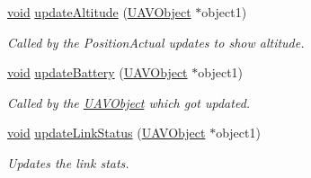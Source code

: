 \begin{DoxyCompactItemize}
\hyperlink{group___u_a_v_objects_plugin_ga444cf2ff3f0ecbe028adce838d373f5c}{void} \hyperlink{group___o_p_map_plugin_ga2502b994bd991dec300fec210a41d06c}{update\-Altitude} (\hyperlink{class_u_a_v_object}{U\-A\-V\-Object} $\ast$object1)
\begin{DoxyCompactList}\small\item\em Called by the Position\-Actual updates to show altitude. \end{DoxyCompactList}\item 
\hyperlink{group___u_a_v_objects_plugin_ga444cf2ff3f0ecbe028adce838d373f5c}{void} \hyperlink{group___o_p_map_plugin_ga098f60a9fd8da31477dcba4496d0f322}{update\-Battery} (\hyperlink{class_u_a_v_object}{U\-A\-V\-Object} $\ast$object1)
\begin{DoxyCompactList}\small\item\em Called by the \hyperlink{class_u_a_v_object}{U\-A\-V\-Object} which got updated. \end{DoxyCompactList}\item 
\hyperlink{group___u_a_v_objects_plugin_ga444cf2ff3f0ecbe028adce838d373f5c}{void} \hyperlink{group___o_p_map_plugin_ga2ac4d982767aaefdeb40a4b506c57497}{update\-Link\-Status} (\hyperlink{class_u_a_v_object}{U\-A\-V\-Object} $\ast$object1)
\begin{DoxyCompactList}\small\item\em Updates the link stats. \end{DoxyCompactList}\end{DoxyCompactItemize}
